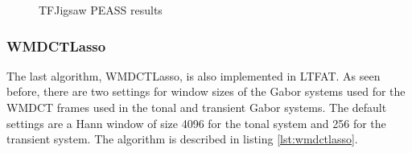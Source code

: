 \documentclass[letter,12pt]{article}
\begin{document}
\begin{figure}[ht]
	\centering
	\caption{TFJigsaw PEASS results}
	\label{fig:jigsaw}
\end{figure}

\vfill
\clearpage

\subsubsection{WMDCTLasso}

The last algorithm, WMDCTLasso\cite{wmdct}, is also implemented in LTFAT. As seen before, there are two settings for window sizes of the Gabor systems used for the WMDCT frames used in the tonal and transient Gabor systems. The default settings are a Hann window of size 4096 for the tonal system and 256 for the transient system. The algorithm is described in listing \ref{lst:wmdctlasso}.
\end{document}
